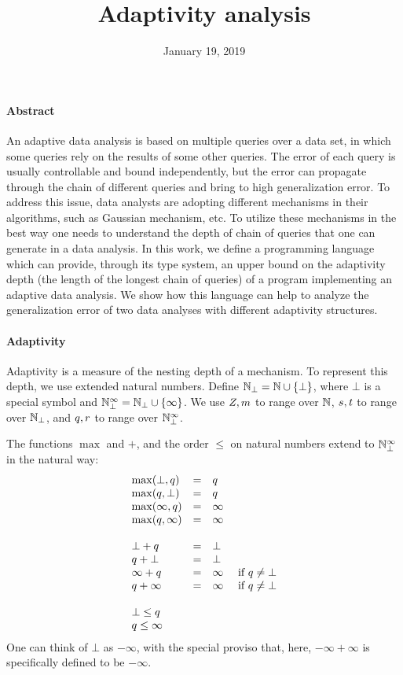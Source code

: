 \documentclass[a4paper,11pt]{article}
\title{Adaptivity analysis}
\author{}
\date{January 19, 2019}
\theoremstyle{definition}
\begin{document}
\maketitle

\paragraph{Abstract}
An adaptive data analysis is based on multiple queries over a data set, in which some queries rely on the results of some other queries. The error of each query is usually controllable and bound independently, but the error can propagate through the chain of different queries and bring to high generalization error. To address this issue, data analysts are adopting different mechanisms in their algorithms, such as Gaussian mechanism, etc. To utilize these mechanisms in the best way one needs to understand the depth of chain of queries that one can generate in a data analysis. In this work, we define a programming language which can provide, through its type system, an upper bound on the adaptivity  depth (the length of the longest chain of queries) of a program implementing an adaptive data analysis. We show how this language can help to analyze the generalization error of two data analyses with different adaptivity structures.

\paragraph{Adaptivity}
Adaptivity is a measure of the nesting depth of a mechanism. To
represent this depth, we use extended natural numbers. Define $\mathbb{N}_{\bot} =
\mathbb{N} \cup \{\bot\}$, where $\bot$ is a special symbol and $\mathbb{N}_{\bot}^\infty =
\mathbb{N}_{\bot} \cup \{\infty\}$. We use $Z, m$ to range over $\mathbb{N}$,
$s, t$ to range over $\mathbb{N}_{\bot}$, and $q, r$ to
range over $\mathbb{N}_{\bot}^\infty$.

The functions $\max$ and $+$, and the order $\leq$ on natural numbers
extend to $\mathbb{N}_{\bot}^\infty$ in the natural way:
\[\begin{array}{lcl}
\max(\bot, \nnatbiA) & = & \nnatbiA \\
\max(\nnatbiA, \bot) & = & \nnatbiA \\
\max(\infty, \nnatbiA) & = & \infty \\
\max(\nnatbiA, \infty) & = & \infty \\
\\
%
\bot + \nnatbiA & = & \bot \\
\nnatbiA + \bot & = & \bot \\
\infty + \nnatbiA & = & \infty ~~~~ \mbox{if } \nnatbiA \neq \bot \\
\nnatbiA + \infty & = & \infty ~~~~ \mbox{if } \nnatbiA \neq \bot \\
\\
%
\bot \leq \nnatbiA \\
\nnatbiA \leq \infty
\end{array}
\]
One can think of $\bot$ as $-\infty$, with the special proviso that,
here, $-\infty + \infty$ is specifically defined to be $-\infty$.
\end{document}

